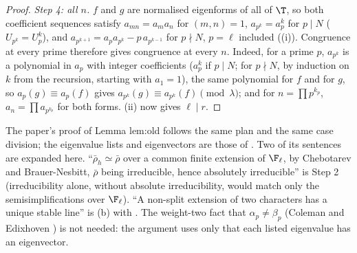 \begin{proof}
\emph{Step 4: all $n$.} $f$ and $g$ are normalised eigenforms of all of $\T$, so both coefficient sequences satisfy $a_{mn}=a_ma_n$ for $(m,n)=1$, $a_{p^k}=a_p^k$ for $p\mid N$
($U_{p^k}=U_p^k$), and $a_{p^{k+1}}=a_pa_{p^k}-p\,a_{p^{k-1}}$ for $p\nmid N$, $p=\ell$ included ((i)). Congruence at every prime therefore gives
congruence at every $n$. Indeed, for a prime $p$, $a_{p^k}$ is a polynomial in $a_p$ with integer coefficients ($a_p^k$ if $p\mid N$; for $p\nmid N$, by induction on $k$ from the
recursion, starting with $a_1=1$), the same polynomial for $f$ and for $g$, so $a_p(g)\equiv a_p(f)$ gives $a_{p^k}(g)\equiv a_{p^k}(f)\pmod\lambda$; and for $n=\prod p^{k_p}$, $a_n=\prod a_{p^{k_p}}$
for both forms. (ii) now gives $\ell\mid r$.
\end{proof}

\begin{paperlink}
The paper's proof of Lemma lem:old follows the same plan and the same case division; the eigenvalue lists and eigenvectors are those of
. Two of its sentences are expanded here. ``$\bar\rho_h\simeq\bar\rho$ over a common finite extension of $\F_\ell$, by Chebotarev and
Brauer-Nesbitt, $\bar\rho$ being irreducible, hence absolutely irreducible'' is Step 2 (irreducibility alone, without absolute irreducibility, would match only
the semisimplifications over $\F_\ell$). ``A non-split extension of two characters has a unique stable line'' is (b) with
. The weight-two fact that $\alpha_p\ne\beta_p$ (Coleman and Edixhoven \cite{ColemanEdixhoven}) is not needed: the argument uses only that each listed
eigenvalue has an eigenvector.
\end{paperlink}

